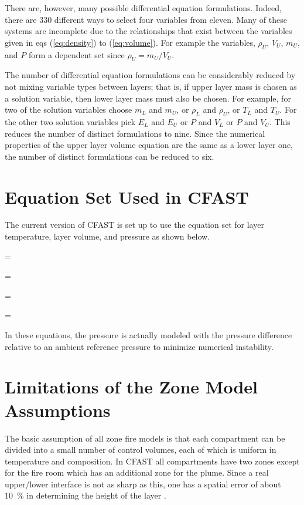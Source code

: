 There are, however, many possible differential equation formulations. Indeed, there are 330
different ways to select four variables from eleven. Many of these systems are incomplete due to
the relationships that exist between the variables given in eqs (\ref{eq:density}) to (\ref{eq:volume}). For example the
variables, $\rho_U$, $V_U$, $m_U$, and $P$ form a dependent set since $\rho_U = m_U / V_U$.

The number of differential equation formulations can be considerably reduced by not mixing
variable types between layers; that is, if upper layer mass is chosen as a solution variable, then
lower layer mass must also be chosen. For example, for two of the solution variables choose $m_L$
and $m_U$, or $\rho_L$ and $\rho_U$, or $T_L$ and $T_U$. For the other two solution variables pick $E_L$ and $E_U$ or $P$ and $V_L$ or $P$ and $V_U$. This reduces the number of distinct formulations to nine. Since the numerical properties of the upper layer volume equation are the same as a lower layer one, the number of
distinct formulations can be reduced to six.

\section{Equation Set Used in CFAST}

The current version of CFAST is set up to use the equation set for layer temperature, layer
volume, and pressure as shown below.

\be {} =    \ee

\be {} =   \ee

\be {} =   \ee

\be {} =   \ee

In these equations, the pressure is actually modeled with the pressure difference relative to an
ambient reference pressure to minimize numerical instability.

\section{Limitations of the Zone Model Assumptions} \label{sec:ZoneModelAssumptions}

The basic assumption of all zone fire models is that each compartment can be divided into a
small number of control volumes, each of which is uniform in temperature and composition. In
CFAST all compartments have two zones except for the fire room which has an additional zone
for the plume. Since a real upper/lower interface is not as sharp as this, one has a spatial error of
about 10~\% in determining the height of the layer \cite{Steckler:1982, Quintiere:1984}.

